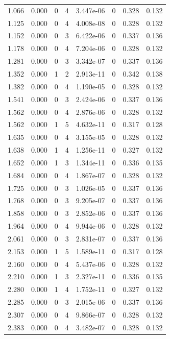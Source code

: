 \documentclass[preview]{standalone}
\begin{document}
{{\begin{tabular}{L{1.2cm}C{1.2cm} C{0.3cm}C{0.5cm} C{1.4cm}C{1.4cm} C{1.4cm}C{1.4cm}}
  1.066  &  0.000  & 0     &  4 &  3.447e-06  & 0  & 0.328 &  0.132   \\ 
  1.125  &  0.000  & 0     &  4 &  4.008e-08  & 0  & 0.328 &  0.132   \\ 
  1.152  &  0.000  & 0     &  3 &  6.422e-06  & 0  & 0.337 &  0.136   \\ 
  1.178  &  0.000  & 0     &  4 &  7.204e-06  & 0  & 0.328 &  0.132   \\ 
  1.281  &  0.000  & 0     &  3 &  3.342e-07  & 0  & 0.337 &  0.136   \\ 
  1.352  &  0.000  & 1     &  2 &  2.913e-11  & 0  & 0.342 &  0.138   \\ 
  1.382  &  0.000  & 0     &  4 &  1.190e-05  & 0  & 0.328 &  0.132   \\ 
  1.541  &  0.000  & 0     &  3 &  2.424e-06  & 0  & 0.337 &  0.136   \\ 
  1.562  &  0.000  & 0     &  4 &  2.876e-06  & 0  & 0.328 &  0.132   \\ 
  1.562  &  0.000  & 1     &  5 &  4.632e-11  & 0  & 0.317 &  0.128   \\ 
  1.635  &  0.000  & 0     &  4 &  3.155e-05  & 0  & 0.328 &  0.132   \\ 
  1.638  &  0.000  & 1     &  4 &  1.256e-11  & 0  & 0.327 &  0.132   \\ 
  1.652  &  0.000  & 1     &  3 &  1.344e-11  & 0  & 0.336 &  0.135   \\ 
  1.684  &  0.000  & 0     &  4 &  1.867e-07  & 0  & 0.328 &  0.132   \\ 
  1.725  &  0.000  & 0     &  3 &  1.026e-05  & 0  & 0.337 &  0.136   \\ 
  1.768  &  0.000  & 0     &  3 &  9.205e-07  & 0  & 0.337 &  0.136   \\ 
  1.858  &  0.000  & 0     &  3 &  2.852e-06  & 0  & 0.337 &  0.136   \\ 
  1.964  &  0.000  & 0     &  4 &  9.944e-06  & 0  & 0.328 &  0.132   \\ 
  2.061  &  0.000  & 0     &  3 &  2.831e-07  & 0  & 0.337 &  0.136   \\ 
  2.153  &  0.000  & 1     &  5 &  1.589e-11  & 0  & 0.317 &  0.128   \\ 
  2.160  &  0.000  & 0     &  4 &  5.437e-06  & 0  & 0.328 &  0.132   \\ 
  2.210  &  0.000  & 1     &  3 &  2.327e-11  & 0  & 0.336 &  0.135   \\ 
  2.280  &  0.000  & 1     &  4 &  1.752e-11  & 0  & 0.327 &  0.132   \\ 
  2.285  &  0.000  & 0     &  3 &  2.015e-06  & 0  & 0.337 &  0.136   \\ 
  2.307  &  0.000  & 0     &  4 &  9.866e-07  & 0  & 0.328 &  0.132   \\ 
  2.383  &  0.000  & 0     &  4 &  3.482e-07  & 0  & 0.328 &  0.132   \\ 
\hline 
\end{tabular} 

}}
\end{document}
